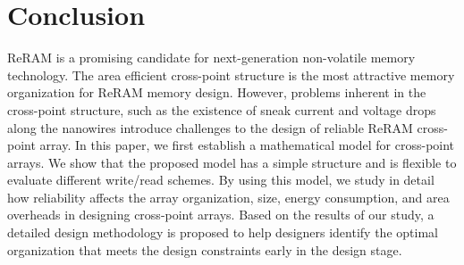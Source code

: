 \vspace{10pt}
\section{Conclusion}\label{sec:conclusion}

ReRAM is a promising candidate for next-generation non-volatile memory technology. The area efficient cross-point structure is the most attractive memory organization for ReRAM memory design. However, problems inherent in the cross-point structure, such as the existence of sneak current and voltage drops along the nanowires introduce challenges to the design of reliable ReRAM cross-point array. In this paper, we first establish a mathematical model for cross-point arrays. We show that the proposed model has a simple structure and is flexible to evaluate different write/read schemes. By using this model, we study in detail how reliability affects the array organization, size, energy consumption, and area overheads in designing cross-point arrays. Based on the results of our study, a detailed design methodology is proposed to help designers identify the optimal organization that meets the design constraints early in the design stage.
